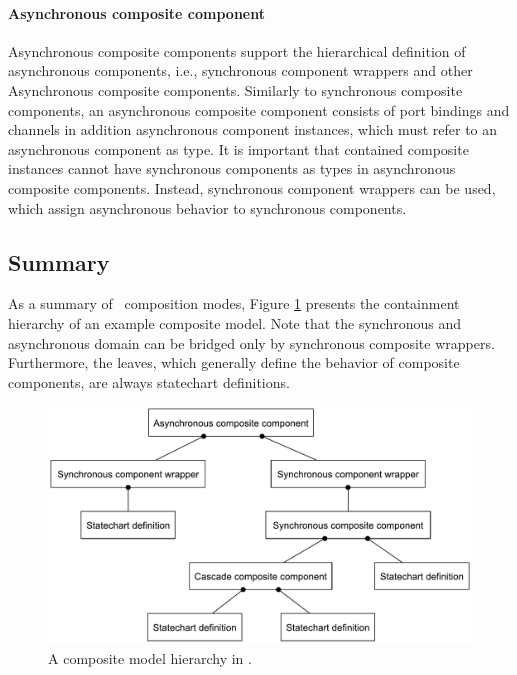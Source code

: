 \paragraph{Asynchronous composite component}
Asynchronous composite components support the hierarchical definition of asynchronous components, i.e., synchronous component wrappers and other Asynchronous composite components. Similarly to synchronous composite components, an asynchronous composite
component consists of port bindings and channels in addition asynchronous component instances, which must refer to an asynchronous component as type. It is important that contained composite instances cannot have synchronous components as types in asynchronous
composite components. Instead, synchronous component wrappers can be used, which assign asynchronous behavior to synchronous components.

\subsection{Summary}
As a summary of \gamma\ composition modes, Figure \ref{fig:gamma-object-tree} presents the containment hierarchy of an example composite model. Note that the synchronous and asynchronous domain can be bridged only by synchronous composite wrappers. Furthermore, the leaves, which generally define the behavior of composite components, are always statechart definitions.

\begin{figure}[htbp]
	\center
	\includegraphics[width=1.0\linewidth]{figures/gamma_object_tree.pdf}
	\caption{A composite model hierarchy in \gamma.}
	\label{fig:gamma-object-tree}
\end{figure}

